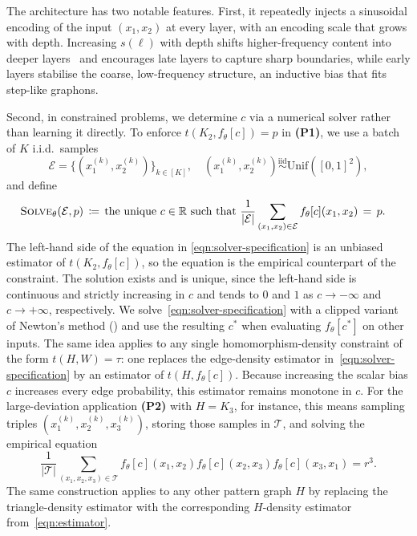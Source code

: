 \documentclass[11pt]{article}
\theoremstyle{plain}
\theoremstyle{definition}
\theoremstyle{remark}
\newcommand*{\R}{\mathbb{R}}
\begin{document}
The architecture has two notable features. First, it repeatedly injects a sinusoidal encoding of the input $(x_1, x_2)$ at every layer, with an encoding scale that grows with depth. Increasing $s(\ell)$ with depth shifts higher-frequency content into deeper layers~\citep{tancik2020fourier} and encourages late layers to capture sharp boundaries, while early layers stabilise the coarse, low-frequency structure, an inductive bias that fits step-like graphons.

Second, in constrained problems, we determine $c$ via a numerical solver rather than learning it directly. To enforce $t(K_2, f_\theta[c]) = p$ in \textbf{(P1)}, we use a batch of $K$ i.i.d.\ samples
\[
\mathcal{E} = \bigl\{(x_1^{(k)}, x_2^{(k)})\bigr\}_{k \in [K]},
\quad
(x_1^{(k)}, x_2^{(k)}) \stackrel{\mathrm{iid}}{\sim} \mathrm{Unif}([0,1]^2),
\]
and define
\begin{align}
\textsc{Solve}_\theta(\mathcal{E}, p)
&\,\coloneqq\, \text{the unique } c \in \R \text{ such that }
\frac{1}{|\mathcal{E}|} \sum_{(x_1, x_2) \in \mathcal{E}} f_\theta[c](x_1, x_2) \,=\, p.
\label{eqn:solver-specification}
\end{align}
The left-hand side of the equation in \eqref{eqn:solver-specification} is an unbiased estimator of $t(K_2, f_\theta[c])$, so the equation is the empirical counterpart of the constraint. The solution exists and is unique, since the left-hand side is continuous and strictly increasing in $c$ and tends to $0$ and $1$ as $c \to -\infty$ and $c \to +\infty$, respectively. We solve~\eqref{eqn:solver-specification} with a clipped variant
of Newton's method () and use the resulting $c^*$ when evaluating $f_\theta[c^*]$ on other inputs.
The same idea applies to any single homomorphism-density constraint of the form $t(H, W)=\tau$: one replaces the edge-density estimator in~\eqref{eqn:solver-specification} by an estimator of $t(H, f_\theta[c])$. Because increasing the scalar bias $c$ increases every edge probability, this estimator remains monotone in $c$. For the large-deviation application \textbf{(P2)} with $H = K_3$, for instance, this means sampling triples $(x^{(k)}_1,x^{(k)}_2,x^{(k)}_3)$, storing those samples in $\mathcal{T}$, and solving the empirical equation
\[
  \frac{1}{|\mathcal{T}|}
  \sum_{(x_1,x_2,x_3)\in\mathcal{T}}
  f_\theta[c](x_1,x_2)f_\theta[c](x_2,x_3)f_\theta[c](x_3,x_1)
  = r^3.
\]
The same construction applies to any other pattern graph $H$ by replacing the triangle-density estimator with the corresponding $H$-density estimator from~\eqref{eqn:estimator}.
\end{document}
